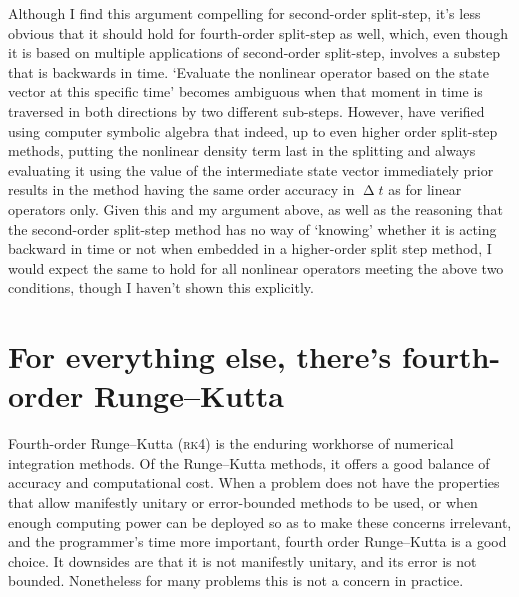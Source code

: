 Although I find this argument compelling for second-order split-step, it's less obvious that it should hold for fourth-order split-step as well, which, even though it is based on multiple applications of second-order split-step, involves a substep that is backwards in time. `Evaluate the nonlinear operator based on the state vector at this specific time' becomes ambiguous when that moment in time is traversed in both directions by two different sub-steps. However, \cite{javanainen_symbolic_2006} have verified using computer symbolic algebra that indeed, up to even higher order split-step methods, putting the nonlinear density term last in the splitting and always evaluating it using the value of the intermediate state vector immediately prior results in the method having the same order accuracy in $\upDelta t$ as for linear operators only. Given this and my argument above, as well as the reasoning that the second-order split-step method has no way of `knowing' whether it is acting backward in time or not when embedded in a higher-order split step method, I would expect the same to hold for all nonlinear operators meeting the above two conditions, though I haven't shown this explicitly.

\section{For everything else, there's fourth-order Runge--Kutta}\label{sec:rk4}

Fourth-order Runge--Kutta (\textsc{rk4}) is the enduring workhorse of numerical integration methods. Of the Runge--Kutta methods, it offers a good balance of accuracy and computational cost. When a problem does not have the properties that allow manifestly unitary or error-bounded methods to be used, or when enough computing power can be deployed so as to make these concerns irrelevant, and the programmer's time more important, fourth order Runge--Kutta is a good choice. It downsides are that it is not manifestly unitary, and its error is not bounded. Nonetheless for many problems this is not a concern in practice.

